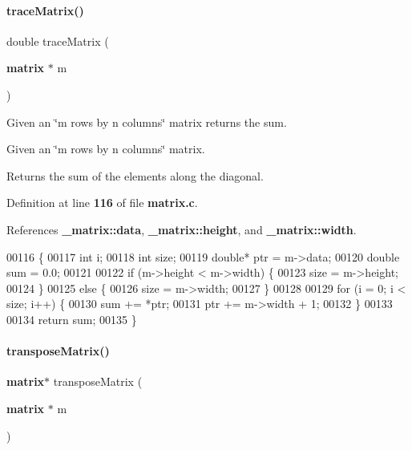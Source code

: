 \paragraph{trace\+Matrix()}
{\footnotesize\ttfamily double trace\+Matrix (\begin{DoxyParamCaption}\item[{\textbf{ matrix} $\ast$}]{m }\end{DoxyParamCaption})}



Given an \char`\"{}m rows by n columns\char`\"{} matrix returns the sum. 

Given an \char`\"{}m rows by n columns\char`\"{} matrix.

\begin{DoxyReturn}{Returns}
the sum of the elements along the diagonal. 
\end{DoxyReturn}


Definition at line \textbf{ 116} of file \textbf{ matrix.\+c}.



References \textbf{ \+\_\+matrix\+::data}, \textbf{ \+\_\+matrix\+::height}, and \textbf{ \+\_\+matrix\+::width}.


\begin{DoxyCode}
00116                               \{
00117     \textcolor{keywordtype}{int} i;
00118     \textcolor{keywordtype}{int} size;
00119     \textcolor{keywordtype}{double}* ptr = m->data;
00120     \textcolor{keywordtype}{double} sum = 0.0;
00121 
00122     \textcolor{keywordflow}{if} (m->height < m->width) \{
00123         size = m->height;
00124     \}
00125     \textcolor{keywordflow}{else} \{
00126         size = m->width;
00127     \}
00128 
00129     \textcolor{keywordflow}{for} (i = 0; i < size; i++) \{
00130         sum += *ptr;
00131         ptr += m->width + 1;
00132     \}
00133 
00134     \textcolor{keywordflow}{return} sum;
00135 \}
\end{DoxyCode}
\mbox{\label{matrix_8c_a2936260302742748b0639e8ec71d4d9f}} 
\paragraph{transpose\+Matrix()}
{\footnotesize\ttfamily \textbf{ matrix}$\ast$ transpose\+Matrix (\begin{DoxyParamCaption}\item[{\textbf{ matrix} $\ast$}]{m }\end{DoxyParamCaption})}




